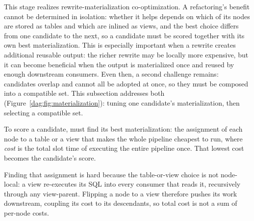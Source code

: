This stage realizes rewrite-materialization co-optimization. 
A refactoring's benefit cannot be determined in isolation: whether it helps depends on which of its nodes are stored as tables and which are inlined as views, and the best choice differs from one candidate to the next, so a candidate must be scored together with its own best materialization. This is especially important when a rewrite creates additional reusable output: the richer rewrite may be locally more expensive, but it can become beneficial when the output is materialized once and reused by enough downstream consumers. Even then, a second challenge remains: candidates overlap and cannot all be adopted at once, so they must be composed into a compatible set. This subsection addresses both (Figure~\ref{dag:fig:materialization}): tuning one candidate's materialization, then selecting a compatible set.





To score a candidate, \dagsmith{} must find its best materialization: the assignment of each node to a table or a view that makes the whole pipeline cheapest to run, where \emph{cost} is 
the total slot time of executing the entire pipeline once.
 That lowest cost becomes the candidate's score.

 Finding that assignment is hard because the table-or-view choice is not node-local: a view re-executes its SQL into every consumer that reads it, recursively through any view-parent. Flipping a node to a view therefore pushes its work downstream, coupling its cost to its descendants, so total cost is not a sum of per-node costs.
 


 
